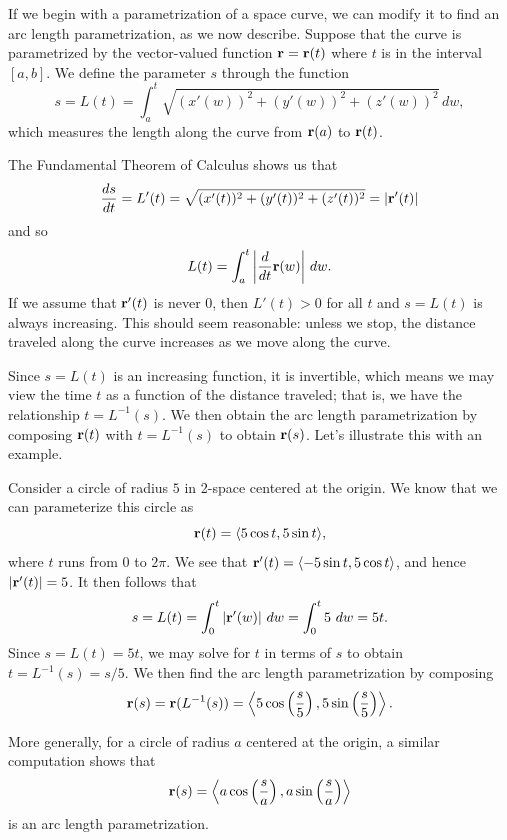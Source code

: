 If we begin with a parametrization of a space curve, we can
modify it to find an arc length parametrization, as we now describe.
Suppose that the curve is parametrized by the vector-valued function
$\mathbf{r} = \mathbf{r}(t)$ where $t$ is in the interval $[a,b]$.  We define the
parameter $s$ through the function
\[s=L(t) = \int_a^t \sqrt{(x'(w))^2 + (y'(w))^2 + (z'(w))^2} \,dw,\] 
which measures the length along the curve from $\mathbf{r}(a)$ to
$\mathbf{r}(t)$.  

The Fundamental Theorem of Calculus shows us that
\begin{equation} \label{eq:9.8.arc_length_prime} \frac{ds}{dt} =
  L'(t)=
  \sqrt{(x'(t))^2 + (y'(t))^2 + (z'(t))^2} = \lvert \mathbf{r}'(t) \rvert
\end{equation}
and so
\[L(t) = \int_a^t \left| \frac{d}{dt}\mathbf{r}(w)\right| \,dw.\] 
If we assume that $\mathbf{r}'(t)$ is never 0, then $L'(t) > 0$ for all $t$
and $s=L(t)$ is always increasing. This should seem reasonable: unless we
stop, the distance traveled along the curve increases as we move along
the curve.

Since $s=L(t)$ is an increasing function, it is invertible, which means
we may view the time $t$ as a function of the distance traveled;  that
is, we have the relationship $t=L^{-1}(s)$.  We then obtain the arc length
parametrization by composing $\mathbf{r}(t)$ with $t=L^{-1}(s)$ to obtain
$\mathbf{r}(s)$.  Let's illustrate this with an example.

\begin{example} \label{ex:9.8.circle_arc_length} Consider a circle of
  radius $5$ in 2-space centered at the origin. We know that we can
  parameterize this circle as
  \[\mathbf{r}(t) = \langle 5\cos t, 5\sin t \rangle, \]
  where $t$ runs from 0 to $2\pi$.  
  We see that $\mathbf{r}'(t) = \langle -5\sin t, 5\cos t\rangle$, and hence
  $|\mathbf{r}'(t)| = 5$.  It then follows that
  $$
  s=L(t) = \int_0^t |\mathbf{r}'(w)|~dw = \int_0^t 5~dw = 5t.
  $$
  Since $s=L(t) = 5t$, we may solve for $t$ in terms of $s$ to obtain
  $t=L^{-1}(s) 
  = s/5$.  We then find the arc length parametrization by composing
  \[\mathbf{r}(s)=\mathbf{r}(L^{-1}(s)) = \left\langle 5\cos\left(\frac s5\right),
  5\sin\left(\frac s5\right)\right\rangle.\]


More generally, for a circle of radius $a$ centered at the origin, a
similar computation shows that
\begin{equation}
\mathbf{r}(s) = \left\langle a\cos\left(\frac sa\right), a\sin\left(\frac sa\right)\right\rangle
\label{eq:9.8.circle_arc_length_parameterization}
\end{equation}
is an arc length parametrization.

\end{example}

